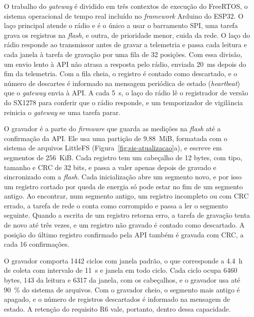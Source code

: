 O trabalho do \textit{gateway} é dividido em três contextos de execução do FreeRTOS, o sistema operacional de tempo real incluído no \textit{framework} Arduino do ESP32. O laço principal atende o rádio e é o único a usar o barramento SPI, uma tarefa grava os registros na \textit{flash}, e outra, de prioridade menor, cuida da rede. O laço do rádio responde ao transmissor antes de gravar a telemetria e passa cada leitura e cada janela à tarefa de gravação por uma fila de \num{32} posições. Com essa divisão, um envio lento à API não atrasa a resposta pelo rádio, enviada \SI{20}{\milli\second} depois do fim da telemetria. Com a fila cheia, o registro é contado como descartado, e o número de descartes é informado na mensagem periódica de estado (\textit{heartbeat}) que o \textit{gateway} envia à API. A cada \SI{5}{\second}, o laço do rádio lê o registrador de versão do SX1278 para conferir que o rádio responde, e um temporizador de vigilância reinicia o \textit{gateway} se uma tarefa parar.

O gravador é a parte do \textit{firmware} que guarda as medições na \textit{flash} até a confirmação da API. Ele usa uma partição de \SI{9,88}{MiB}, formatada com o sistema de arquivos LittleFS (Figura~\ref{fig:sis-atualizacao}a), e escreve em segmentos de \SI{256}{KiB}. Cada registro tem um cabeçalho de \num{12} bytes, com tipo, tamanho e CRC de \num{32} bits, e passa a valer apenas depois de gravado e sincronizado com a \textit{flash}. Cada inicialização abre um segmento novo, e por isso um registro cortado por queda de energia só pode estar no fim de um segmento antigo. Ao encontrar, num segmento antigo, um registro incompleto ou com CRC errado, a tarefa de rede o conta como corrompido e passa a ler o segmento seguinte. Quando a escrita de um registro retorna erro, a tarefa de gravação tenta de novo até três vezes, e um registro não gravado é contado como descartado. A posição do último registro confirmado pela API também é gravada com CRC, a cada \num{16} confirmações.

O gravador comporta \num{1442} ciclos com janela padrão, o que corresponde a \SI{4,4}{\hour} de coleta com intervalo de \SI{11}{\second} e janela em todo ciclo. Cada ciclo ocupa \num{6460} bytes, \num{143} da leitura e \num{6317} da janela, com os cabeçalhos, e o gravador usa até \SI{90}{\percent} do sistema de arquivos. Com o gravador cheio, o segmento mais antigo é apagado, e o número de registros descartados é informado na mensagem de estado. A retenção do requisito R6 vale, portanto, dentro dessa capacidade.

